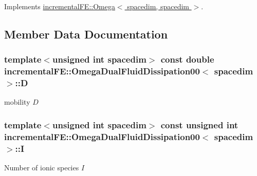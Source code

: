 Implements \hyperlink{classincremental_f_e_1_1_omega_3_01spacedim_00_01spacedim_01_4_a40131354ef0a28ca48a0e6c9ed33aa33}{incremental\+F\+E\+::\+Omega$<$ spacedim, spacedim $>$}.



\subsection{Member Data Documentation}
\subsubsection[{\texorpdfstring{D}{D}}]{\setlength{\rightskip}{0pt plus 5cm}template$<$unsigned int spacedim$>$ const double {\bf incremental\+F\+E\+::\+Omega\+Dual\+Fluid\+Dissipation00}$<$ spacedim $>$\+::D\hspace{0.3cm}{\ttfamily [private]}}\hypertarget{classincremental_f_e_1_1_omega_dual_fluid_dissipation00_a3ce80218311cfbcf3cbf790dea3f9efd}{}\label{classincremental_f_e_1_1_omega_dual_fluid_dissipation00_a3ce80218311cfbcf3cbf790dea3f9efd}
mobility $D$ 
\subsubsection[{\texorpdfstring{I}{I}}]{\setlength{\rightskip}{0pt plus 5cm}template$<$unsigned int spacedim$>$ const unsigned int {\bf incremental\+F\+E\+::\+Omega\+Dual\+Fluid\+Dissipation00}$<$ spacedim $>$\+::I\hspace{0.3cm}{\ttfamily [private]}}\hypertarget{classincremental_f_e_1_1_omega_dual_fluid_dissipation00_ac10745e41cfa5deeb5a006e5379809fe}{}\label{classincremental_f_e_1_1_omega_dual_fluid_dissipation00_ac10745e41cfa5deeb5a006e5379809fe}
Number of ionic species $I$ 

